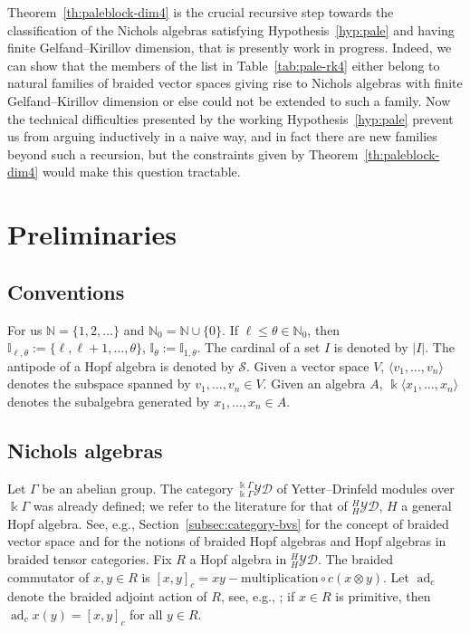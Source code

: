 \documentclass[pdftex]{sigma}
\numberwithin{equation}{section}
\newcommand{\adc}{\operatorname{ad}_c}
\newcommand{\Ss}{\mathcal{S}}
\newcommand{\I}{{\mathbb I}}
\newcommand{\N}{{\mathbb N}}
\newcommand{\yd}[1]{{}_{#1}^{#1}\mathcal{YD}}
\begin{document}
Theorem~\ref{th:paleblock-dim4} is the crucial recursive step towards the classification of the Nichols algebras
satisfying Hypothesis~\ref{hyp:pale} and having finite Gelfand--Kirillov dimension, that is presently work in progress.
Indeed, we can show that the members of the list in Table~\ref{tab:pale-rk4}
either belong to natural families of braided vector spaces giving rise to Nichols algebras with finite Gelfand--Kirillov dimension
or else could not be extended to such a family.
Now the technical difficulties presented by the working Hypothesis~\ref{hyp:pale} prevent us from arguing inductively
in a naive way, and in fact there are new families beyond such a recursion, but the constraints given by Theorem~\ref{th:paleblock-dim4} would make this question tractable.


\section{Preliminaries}
\subsection{Conventions}
For us $\mathbb{N} = \{1,2,\dots\}$ and $\N_0 = \N \cup \{0\}$.
If $\ell \leq \theta \in\N_0$, then $\I_{\ell, \theta} := \{\ell, \ell +1,\dots,\theta\}$, $\I_{\theta} := \I_{1, \theta}$.
The cardinal of a set $I$ is denoted by $\vert I \vert$.
The antipode of a Hopf algebra is denoted by $\Ss$.
Given a vector space $V$, $\langle v_1, \dots, v_n\rangle$ denotes the subspace spanned by $v_1, \dots, v_n \in V$.
Given an algebra $A$, $\Bbbk\langle x_1, \dots, x_n\rangle$ denotes the subalgebra generated by $x_1, \dots, x_n \in A$.


\subsection{Nichols algebras}%
Let $\Gamma$ be an abelian group.
The category $\yd{\Bbbk \Gamma}$ of Yetter--Drinfeld modules over $\Bbbk\Gamma$
was already defined; we refer to the literature for that of $\yd{H}$, $H$ a general Hopf algebra. See, e.g., Section~\ref{subsec:category-bvs}
for the concept of braided vector space and
\cite{A-leyva} for the notions of braided Hopf algebras and Hopf algebras in braided tensor categories.
Fix $R$ a Hopf algebra in $\yd{H}$. The braided commutator of $x,y\in R$ is $[x,y]_c = xy - \text{multiplication} \circ c (x\otimes y)$.
Let $\adc$ denote the braided adjoint action of $R$, see, e.g., \cite[p.~165]{A-leyva};
if $x\in R$ is primitive, then
$\adc x (y) =[x,y]_c$ for all $y\in R$.
\end{document}
